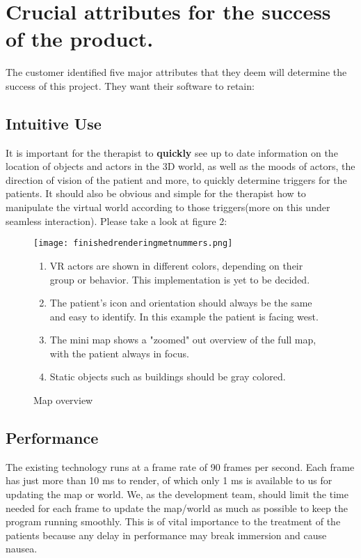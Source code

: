 \documentclass[11pt]{article}
\begin{document}
\section{Crucial attributes for the success of the product.}
	The customer identified five major attributes that they deem will determine the success of this project. They want their software to retain:       
    \subsection{Intuitive Use}
    It is important for the therapist to \textbf{quickly} see up to date information on the location of objects and actors in the 3D world, as well as the moods of actors, the direction of vision of the patient and more, to quickly determine triggers for the patients. It should also be obvious and simple for the therapist how to manipulate the virtual world according to those triggers(more on this under seamless interaction). Please take a look at figure 2:
\begin{figure}[h]
	\caption{Map overview}
	\texttt{[image: finishedrenderingmetnummers.png]}
    \begin{enumerate}
    \item VR actors are shown in different colors, depending on their group or behavior. This implementation is yet to be decided.
    \item The patient's icon and orientation should always be the same and easy to identify. In this example the patient is facing west.
    \item The mini map shows a "zoomed" out overview of the full map, with the patient always in focus.
    \item Static objects such as buildings should be gray colored.
	\end{enumerate}    
\end{figure}
    
    \subsection{Performance}    
    The existing technology runs at a frame rate of 90 frames per second. Each frame has just more than 10 ms to render, of which only 1 ms is available to us for updating the map or world. We, as the development team, should limit the time needed for each frame to update the map/world as much as possible to keep the program running smoothly. This is of vital importance to the treatment of the patients because any delay in performance may break immersion and cause nausea.
    
\end{document}
